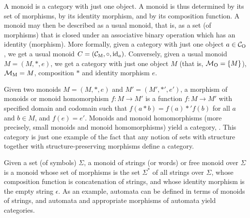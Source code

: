 \begin{example}
  \label{ex:monoid}



  A monoid is a category with just one object. A monoid is thus
  determined by its set of morphisms, by its identity morphism, and by
  its composition function. A monoid may then be described as a usual
  monoid, that is, as a set (of morphisms) that is closed under an
  associative binary operation which has an identity (morphism). More
  formally, given a category  with just one object $a \in
  \mathcal{C}_{\operatorname{O}}$, we get a usual monoid $C = (\mathcal{C}_{\operatorname{M}}, \mathrel{\circ}, \operatorname{id}_{a})$.
  Conversely, given a usual monoid $M = (M, *, e)$, we get a category
   with just one object $M$ (that is, $\mathcal{M}_{\operatorname{O}} = \{M\}$),
  $\mathcal{M}_{\operatorname{M}} = M$, composition $*$ and identity morphism $e$.

  Given two monoids $M = (M, *, e)$ and $M' = (M', *', e')$, a
  morphism of monoids or monoid homomorphism $f: M \to M'$ is a
  function $f: M \to M'$ with specified domain and codomain such that
  $f(a * b) = f(a) *' f(b)$ for all $a$ and $b \in M$, and $f(e) =
  e'$. Monoids and monoid homomorphisms (more precisely, small monoids
  and monoid homomorphisms) yield a category, . This
  category is just one example of the fact that any notion of sets
  with structure together with structure-preserving morphisms define a
  category.

\end{example}

\begin{example}
  \label{ex:monoid-strings}


  Given a set (of symbols) $\Sigma$, a monoid of strings (or words) or
  free monoid over $\Sigma$ is a monoid whose set of morphisms is the
  set $\Sigma^{*}$ of all strings over $\Sigma$, whose composition
  function is concatenation of strings, and whose identity morphism is
  the empty string $\epsilon$. As an example, automata can be defined
  in terms of monoids of strings, and automata and appropriate
  morphisms of automata yield categories.

\end{example}

